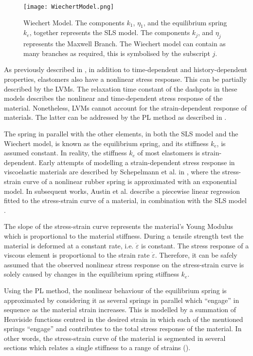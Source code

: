 \begin{figure}[hbt!]
	\centering
    \texttt{[image: WiechertModel.png]}
    \caption{Wiechert Model. The components $k_1$, $\eta_1$, and the equilibrium spring $k_e$, together represents the SLS model. The components $k_j$, and $\eta_j$ represents the Maxwell Branch. The Wiechert model can contain as many branches as required, this is symbolised by the subscript $j$. }
    \label{fig:wiechert}
\end{figure}

As previously described in , in addition to time-dependent and history-dependent properties, elastomers also have a nonlinear stress response. This can be partially described by the LVMs. The relaxation time constant of the dashpots in these models describes the nonlinear and time-dependent stress response of the material. Nonetheless, LVMs cannot account for the strain-dependent response of materials. The latter can be addressed by the PL method as described in \cite{austin2015control}.

The spring in parallel with the other elements, in both the SLS model and the Wiechert model, is known as the equilibrium spring, and its stiffness $k_e$, is assumed constant. In reality, the stiffness $k_e$ of most elastomers is strain-dependent. Early attempts of modelling a strain-dependent stress response in viscoelastic materials are described by Schepelmann et al. in \cite{schepelmann2014compact}, where the stress-strain curve of a nonlinear rubber spring is approximated with an exponential model. In subsequent works, Austin et al. describe a piecewise linear regression fitted to the stress-strain curve of a material, in combination with the SLS model \cite{austin2015control}. 

The slope of the stress-strain curve represents the material's Young Modulus which is proportional to the material stiffness. During a tensile strength test the material is deformed at a constant rate, i.e. $\dot{\varepsilon}$ is constant. The stress response of a viscous element is proportional to the strain rate $\dot{\varepsilon}$. Therefore, it can be safely assumed that the observed nonlinear stress response on the stress-strain curve is solely caused by changes in the equilibrium spring stiffness $k_e$.

Using the PL method, the nonlinear behaviour of the equilibrium spring is approximated by considering it as several springs in parallel which ``engage'' in sequence as the material strain increases. This is modelled by a summation of Heaviside functions centred in the desired strain in which each of the mentioned springs ``engage'' and contributes to the total stress response of the material. In other words, the stress-strain curve of the material is segmented in several sections which relates a single stiffness to a range of strains ().

